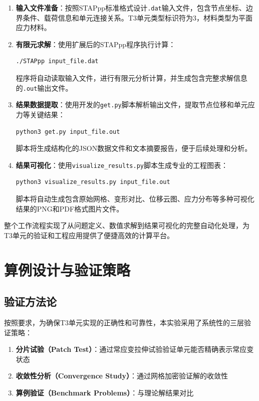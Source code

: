 \documentclass[12pt,a4paper]{article}
\begin{document}
\begin{enumerate}
    \item \textbf{输入文件准备}：按照STAPpp标准格式设计\texttt{.dat}输入文件，包含节点坐标、边界条件、载荷信息和单元连接关系。T3单元类型标识符为3，材料类型为平面应力材料。

    \item \textbf{有限元求解}：使用扩展后的STAPpp程序执行计算：
    \begin{lstlisting}[language=bash]
./STAPpp input_file.dat
    \end{lstlisting}
    程序将自动读取输入文件，进行有限元分析计算，并生成包含完整求解信息的\texttt{.out}输出文件。

    \item \textbf{结果数据提取}：使用开发的\texttt{get.py}脚本解析输出文件，提取节点位移和单元应力等关键结果：
    \begin{lstlisting}[language=bash]
python3 get.py input_file.out
    \end{lstlisting}
    脚本将生成结构化的JSON数据文件和文本摘要报告，便于后续处理和分析。

    \item \textbf{结果可视化}：使用\texttt{visualize\_results.py}脚本生成专业的工程图表：
    \begin{lstlisting}[language=bash]
python3 visualize_results.py input_file.out
    \end{lstlisting}
    脚本将自动生成包含原始网格、变形对比、位移云图、应力分布等多种可视化结果的PNG和PDF格式图片文件。
\end{enumerate}

整个工作流程实现了从问题定义、数值求解到结果可视化的完整自动化处理，为T3单元的验证和工程应用提供了便捷高效的计算平台。

\section{算例设计与验证策略}

\subsection{验证方法论}

按照要求，为确保T3单元实现的正确性和可靠性，本实验采用了系统性的三层验证策略：

\begin{enumerate}
    \item \textbf{分片试验（Patch Test）}：通过常应变拉伸试验验证单元能否精确表示常应变状态
    \item \textbf{收敛性分析（Convergence Study）}：通过网格加密验证解的收敛性
    \item \textbf{算例验证（Benchmark Problems）}：与理论解结果对比
\end{enumerate}
\end{document}
